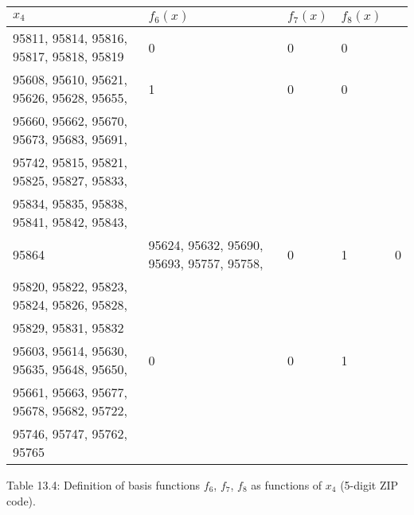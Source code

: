 \begin{table}
\begin{tabular}{l l l l l} \hline \hline \(x_{4}\) & \(f_{6}(x)\) & \(f_{7}(x)\) & \(f_{8}(x)\) \\ \hline
95811, 95814, 95816, 95817, 95818, 95819 & 0 & 0 & 0 \\
95608, 95610, 95621, 95626, 95628, 95655, & 1 & 0 & 0 \\
95660, 95662, 95670, 95673, 95683, 95691, & & & \\
95742, 95815, 95821, 95825, 95827, 95833, & & & \\
95834, 95835, 95838, 95841, 95842, 95843, & & & \\
95864 & 95624, 95632, 95690, 95693, 95757, 95758, & 0 & 1 & 0 \\
95820, 95822, 95823, 95824, 95826, 95828, & & & \\
95829, 95831, 95832 & & & & \\
95603, 95614, 95630, 95635, 95648, 95650, & 0 & 0 & 1 \\
95661, 95663, 95677, 95678, 95682, 95722, & & & \\
95746, 95747, 95762, 95765 & & & \\ \hline \hline \end{tabular}
\end{table}
Table 13.4: Definition of basis functions \(f_{6}\), \(f_{7}\), \(f_{8}\) as functions of \(x_{4}\) (5-digit ZIP code).

 